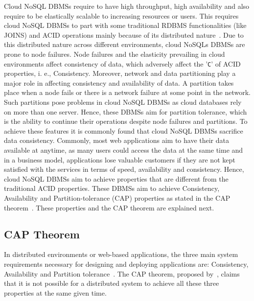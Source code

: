 Cloud \ac{NoSQL} \acp{DBMS} require to have high throughput,   high availability
and also require to be elastically scalable to increasing resources or users.
This requires cloud \ac{NoSQL} \acp{DBMS} to part with some traditional
\ac{RDBMS} functionalities (like JOINS) and ACID operations mainly because of
its distributed nature~\citep{Wada}. Due to this distributed nature across
different environments,   cloud \acp{NoSQL} \acp{DBMS} are prone to node
failures.   Node failures and the elasticity prevailing in cloud environments
affect consistency of data,   which adversely affect the '\texttt{C}' of ACID
properties,   i.  e.,   Consistency. Moreover,  network and data partitioning
 play a major role in affecting consistency and availability of data.  A
 partition takes place when a node fails or there is a network failure at some
 point in the network.  Such partitions pose problems in cloud \ac{NoSQL}
 \acp{DBMS}  as cloud databases rely on more than one server. Hence,
these \acp{DBMS}  aim for partition tolerance,   which is the ability to
continue their operations despite node failures and partitions.   To achieve
these features it is commonly found that cloud \ac{NoSQL} \acp{DBMS} sacrifice
data consistency.   Commonly,   most web applications aim to have their data
available at anytime,   as many users could access the data at the same time and
in a business model,   applications lose valuable customers if they are not kept
satisfied with the services in terms of speed,   availability and consistency.
Hence,   cloud \ac{NoSQL} \acp{DBMS} aim to achieve properties that are
different from the traditional ACID properties. These \acp{DBMS} aim to achieve
 Consistency, Availability and Partition-tolerance (CAP) properties as stated in
 the CAP theorem~\citep{Gilbert,Ramakrishnan,Wada}.
These properties and the CAP theorem are explained next.

\subsection{CAP Theorem} \label{ss:cap}
In distributed environments or web-based applications,  the three main system
requirements necessary for designing and deploying applications are:
Consistency,   Availability and Partition
tolerance~\citep{Brewer,Gilbert,Ramakrishnan,Wada}.  The CAP theorem, proposed
by~\citet{Brewer}, claims that it is not possible for a distributed system to
achieve all these three properties at the same given time.

